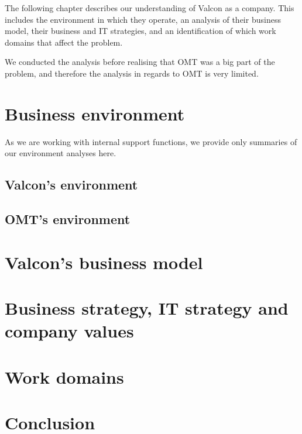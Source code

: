 The following chapter describes our understanding of Valcon as a company. This includes the environment in which they operate, an analysis of their business model, their business and IT strategies, and an identification of which work domains that affect the problem.

We conducted the analysis before realising that OMT was a big part of the problem, and therefore the analysis in regards to OMT is very limited.

\section{Business environment}
As we are working with internal support functions, we provide only summaries of our environment analyses here.
\subsection{Valcon's environment}

\subsection{OMT's environment}

\section{Valcon's business model}

\section{Business strategy, IT strategy and company values}

\section{Work domains}

\section{Conclusion}
